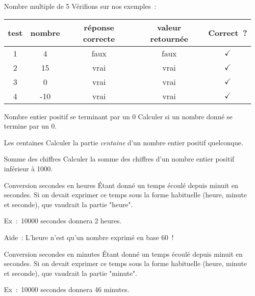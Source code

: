 \begin{Exercice}{Nombre multiple de 5}
			Vérifions sur nos exemples~:
		\begin{center}
			\begin{tabular}{|c|c|c|c|c|}
				\hline
				test \no & nombre & réponse correcte & valeur retournée & Correct~? \\\hline
				\hline 
				1 & 4   & faux & faux & {\color{ForestGreen}$\checkmark$} \\\hline
				2 & 15  & vrai & vrai & {\color{ForestGreen}$\checkmark$} \\\hline
				3 & 0   & vrai & vrai & {\color{ForestGreen}$\checkmark$} \\\hline
				4 & -10 & vrai & vrai & {\color{ForestGreen}$\checkmark$} \\\hline
			\end{tabular}
		\end{center}
	\end{Exercice}

	\begin{Exercice}{Nombre entier positif se terminant par un 0}
		Calculer si un nombre donné se termine par un 0.
	\end{Exercice}

	\begin{Exercice}{Les centaines}
		Calculer la partie \emph{centaine}
		d’un nombre entier positif quelconque.
	\end{Exercice}

	\begin{Exercice}{Somme des chiffres}
		Calculer la somme des chiffres
		d’un nombre entier positif inférieur à 1000.
	\end{Exercice}

	\begin{Exercice}{Conversion secondes en heures}
		Étant donné un temps écoulé depuis minuit en secondes.
		Si on devait exprimer ce temps sous la forme
		habituelle (heure, minute et seconde),
		que vaudrait la partie "heure".

		Ex~:~10000 secondes donnera 2 heures.

		Aide~: L’heure n’est qu’un nombre exprimé en base 60~!
	\end{Exercice}

	\begin{Exercice}{Conversion secondes en minutes}
		Étant donné un temps écoulé depuis minuit en secondes.
		Si on devait exprimer ce temps sous la forme
		habituelle (heure, minute et seconde),
		que vaudrait la partie "minute".

		Ex~:~10000 secondes donnera 46 minutes.
	\end{Exercice}

